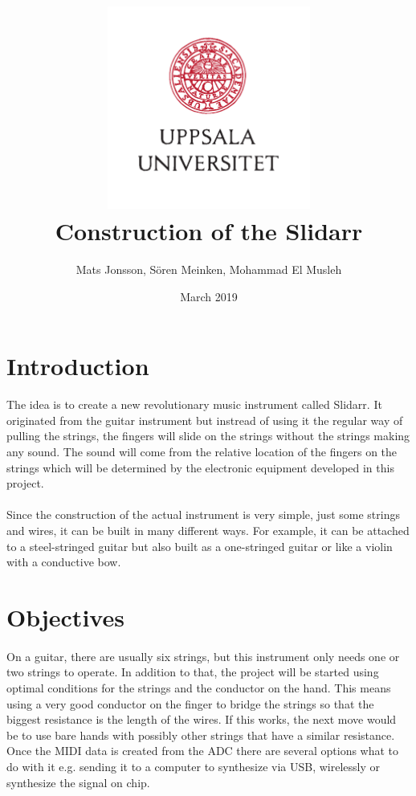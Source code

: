 \documentclass{article}
\title{\includegraphics[width=0.5\textwidth]{UU_logo.pdf}\\
Construction of the Slidarr}
\author{Mats Jonsson, Sören Meinken, Mohammad El Musleh}
\date{March 2019}
\begin{document}
\maketitle

\section{Introduction}
\paragraph{}The idea is to create a new revolutionary music instrument called Slidarr. It originated from the guitar instrument but instread of using it the regular way of pulling the strings, the fingers will slide on the strings without the strings making any sound. The sound will come from the relative location of the fingers on the strings which will be determined by the electronic equipment developed in this project.

\paragraph{}Since the construction of the actual instrument is very simple, just some strings and wires, it can be built in many different ways. For example, it can be attached to a steel-stringed guitar but also built as a one-stringed guitar or like a violin with a conductive bow.

\section{Objectives}
\paragraph{}On a guitar, there are usually six strings, but this instrument only needs one or two strings to operate. In addition to that, the project will be started using optimal conditions for the strings and the conductor on the hand. This means using a very good conductor on the finger to bridge the strings so that the biggest resistance is the length of the wires. If this works, the next move would be to use bare hands with possibly other strings that have a similar resistance. Once the MIDI data is created from the ADC there are several options what to do with it e.g. sending it to a computer to synthesize via USB, wirelessly or synthesize the signal on chip.
\end{document}
